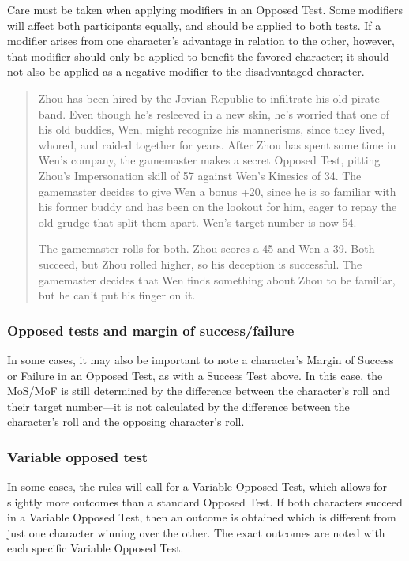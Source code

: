 Care must be taken when applying modifiers in an Opposed Test. Some modifiers will affect both participants equally, and should be applied to both tests. If a modifier arises from one character's advantage in relation to the other, however, that modifier should only be applied to benefit the favored character; it should not also be applied as a negative modifier to the disadvantaged character. 

\begin{quotation} Zhou has been hired by the Jovian Republic to infiltrate his old pirate band. Even though he's resleeved in a new skin, he's worried that one of his old buddies, Wen, might recognize his mannerisms, since they lived, whored, and raided together for years. After Zhou has spent some time in Wen's company, the gamemaster makes a secret Opposed Test, pitting Zhou's Impersonation skill of 57 against Wen's Kinesics of 34. The gamemaster decides to give Wen a bonus +20, since he is so familiar with his former buddy and has been on the lookout for him, eager to repay the old grudge that split them apart. Wen's target number is now 54. 

The gamemaster rolls for both. Zhou scores a 45 and Wen a 39. Both succeed, but Zhou rolled higher, so his deception is successful. The gamemaster decides that Wen finds something about Zhou to be familiar, but he can't put his finger on it. \end{quotation} 

\subsubsection{Opposed tests and margin of success/failure} \label{sec:opposed-tests-margin} 

In some cases, it may also be important to note a character's Margin of Success or Failure in an Opposed Test, as with a Success Test above. In this case, the MoS/MoF is still determined by the difference between the character's roll and their target number—it is not calculated by the difference between the character's roll and the opposing character's roll. 

\subsubsection{Variable opposed test} \label{sec:vari-oppos-test} 

In some cases, the rules will call for a Variable Opposed Test, which allows for slightly more outcomes than a standard Opposed Test. If both characters succeed in a Variable Opposed Test, then an outcome is obtained which is different from just one character winning over the other. The exact outcomes are noted with each specific Variable Opposed Test. 

